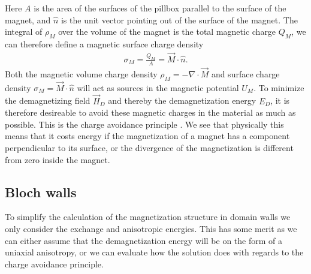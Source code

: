 \documentclass[12pt, a4paper]{article}		%
\numberwithin{equation}{section}
\begin{document}
Here $A$ is the area of the surfaces of the pillbox parallel to the surface of the magnet, and $\hat{n}$ is the unit vector pointing out of the surface of the magnet. The integral of $\rho_M$ over the volume of the magnet is the total magnetic charge $Q_M$, we can therefore define a magnetic surface charge density
\begin{align}
\label{eq:magsurfacecharge}
\sigma_M = \frac{Q_M}{A} = \vec{M}\cdot\hat{n}.
\end{align}
Both the magnetic volume charge density $\rho_M = -\nabla\cdot\vec{M}$ and surface charge density $\sigma_M = \vec{M}\cdot\hat{n}$ will act as sources in the magnetic potential $U_M$. To minimize the demagnetizing field $\vec{H}_D$ and thereby the demagnetization energy $E_D$, it is therefore desireable to avoid these magnetic charges in the material as much as possible. This is the charge avoidance principle \cite{Coey}. We see that physically this means that it costs energy if the magnetization of a magnet has a component perpendicular to its surface, or the divergence of the magnetization is different from zero inside the magnet.

\subsection{Bloch walls}
To simplify the calculation of the magnetization structure in domain walls we only consider the exchange and anisotropic energies. This has some merit as we can either assume that the demagnetization energy will be on the form of a uniaxial anisotropy, or we can evaluate how the solution does with regards to the charge avoidance principle.
\end{document}
